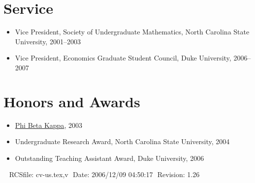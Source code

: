 \documentclass[overlapped,line,letterpaper]{res}
\begin{document}
\begin{resume}

%


\section{\bf Service}

\begin{itemize}
\item Vice President, Society of Undergraduate Mathematics, North
  Carolina State University, 2001--2003
\item Vice President, Economics Graduate Student Council, Duke
  University, 2006--2007
\end{itemize}


\section{\bf Honors and Awards}
\begin{itemize}
\item \href{http://www.pbk.org/}{Phi Beta Kappa}, 2003
\item Undergraduate Research Award, North Carolina State University, 2004
\item Outstanding Teaching Assistant Award, Duke University, 2006
\end{itemize}


\begin{center}
\vspace{\fill}\ \newline
{\tiny \rm $ $RCSfile: cv-us.tex,v $ $ }
{\tiny \rm $ $Date: 2006/12/09 04:50:17 $ $ }
{\tiny \rm $ $Revision: 1.26 $ $ }
\end{center}

\end{resume}
\end{document}
